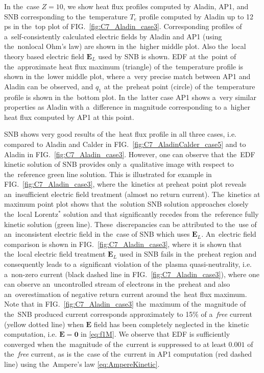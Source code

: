 \documentclass[
 aps,
 jmp,
 amsmath,amssymb,
 twocolumn,
]{revtex4-1}
\newcommand{\figref}[1]{FIG.~\ref{#1}}
\newcommand{\vect}[1]{\boldsymbol{#1}}
\newcommand{\Zbar}{Z}
\newcommand{\E}{\vect{E}}
\newcommand{\Te}{T_e}
\begin{document}
In the~case $\Zbar = 10$, we show heat flux profiles
computed by Aladin, AP1, and SNB corresponding to the~temperature $\Te$
profile computed by Aladin up to 12 ps 
in the~top plot of \figref{fig:C7_Aladin_case3}. 
Corresponding profiles of 
a~self-consistently calculated electric fields by Aladin and AP1 
(using the~nonlocal Ohm's law) are shown in the~higher middle plot.
Also the~local theory based electric field $\E_L$ used by SNB is shown.
EDF at the~point of the~approximate heat flux maximum (triangle) of
the~temperature profile is shown in the~lower middle plot, 
where a~very precise match between AP1 and Aladin can be observed, 
and $q_1$ at the~preheat point (circle) of the~temperature profile is shown 
in the~bottom plot. In the~latter case AP1 shows a~very similar properties 
as Aladin with a~difference in magnitude corresponding to a~higher 
heat flux computed by AP1 at this point. 

SNB shows very good results of the~heat flux profile in all three cases, 
i.e. compared to Aladin and Calder in \figref{fig:C7_AladinCalder_case5} 
and to Aladin in \figref{fig:C7_Aladin_case3}. 
However, one can observe that the~EDF kinetic solution of SNB provides 
only a~qualitative image with respect to the~reference green line solution. 
This is illustrated for example in
\figref{fig:C7_Aladin_case3}, where the~kinetics at preheat point plot 
reveals an~insufficient electric field treatment (almost no return current). 
The~kinetics at maximum point plot shows that the~solution SNB solution
approaches closely the~local Lorentz$^*$ solution and that 
significantly recedes from the~reference fully kinetic solution (green line).
These~discrepancies can be attributed to the~use of an~inconsistent 
electric field in the~case of SNB which uses $\E_L$. An~electric field 
comparison is shown in \figref{fig:C7_Aladin_case3}, where it is shown that 
the~local electric field treatment $\E_L$ used in SNB fails 
in the~preheat region and consequently leads to 
a~significant violation of the~plasma quasi-neutrality,
i.e. a~non-zero current (black dashed line in \figref{fig:C7_Aladin_case3}),
where one can observe an~uncontrolled stream of 
electrons in the~preheat and also an~overestimation of negative return current
around the~heat flux maximum. Note that in \figref{fig:C7_Aladin_case3} 
the~maximum of the~magnitude of the~SNB produced current corresponds 
approximately to 15$\%$ of a~\textit{free} current (yellow dotted line) 
when $\E$ field has been completely neglected 
in the~kinetic computation, i.e. $\E=\vect{0}$ in \eqref{eq:f1M}. 
We observe that EDF is sufficiently converged when the~magnitude of 
the~current is suppressed to at least $0.001$ of the~\textit{free} current,
as is the~case of the~current in AP1 computation (red dashed line) using
the~Ampere's law \eqref{eq:AmpereKinetic}.
\end{document}
